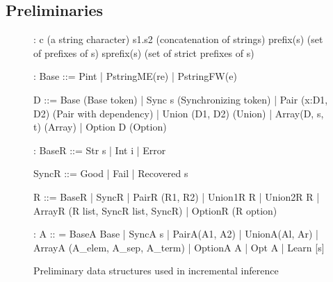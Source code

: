 \subsection{Preliminaries}

\begin{figure}[t]
{\small 
\begin{code}
:
c          (a string character)	
s1.s2      (concatenation of strings)
prefix(s)  (set of prefixes of s)
sprefix(s) (set of strict prefixes of s)
\end{code}
\begin{code}
:
Base ::= Pint | PstringME(re) | PstringFW(e)
\end{code}
\begin{code}
D ::=   
  Base               (Base token)
| Sync s             (Synchronizing token) 
| Pair (x:D1, D2)    (Pair with dependency)
| Union (D1, D2)     (Union)
| Array(D, s, t)     (Array)
| Option D           (Option)
\end{code}
\begin{code}
:
BaseR ::= Str s | Int i | Error
\end{code}
\begin{code}
SyncR ::= Good | Fail | Recovered s 
\end{code}
\begin{code}
R ::=
  BaseR
| SyncR
| PairR (R1, R2)
| Union1R R | Union2R R 
| ArrayR (R list, SyncR list, SyncR)
| OptionR (R option)
\end{code}
\begin{code}
:
A :: = 
  BaseA Base
| SyncA s
| PairA(A1, A2)
| UnionA(Al, Ar)
| ArrayA (A_elem, A_sep, A_term)
| OptionA A
| Opt A
| Learn [s]
\end{code}
}
\caption{Preliminary data structures used in incremental inference}
\label{fig:data-structures}
\end{figure}


